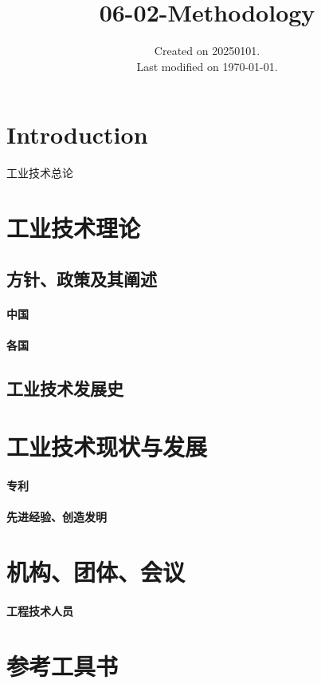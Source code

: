 \documentclass[UTF8]{../../ApplicationUniverse}
\begin{document}
\title{06-02-Methodology}
\date{Created on 20250101.\\   Last modified on \today.}
\maketitle
\tableofcontents


\chapter{Introduction}
工业技术总论

\chapter{工业技术理论}
\section{方针、政策及其阐述}
    \subsubsection{中国}
    \subsubsection{各国}
\section{工业技术发展史}

\chapter{工业技术现状与发展}
    \subsubsection{专利}
    \subsubsection{先进经验、创造发明}

\chapter{机构、团体、会议}
    \subsubsection{工程技术人员}

\chapter{参考工具书}
\end{document}
